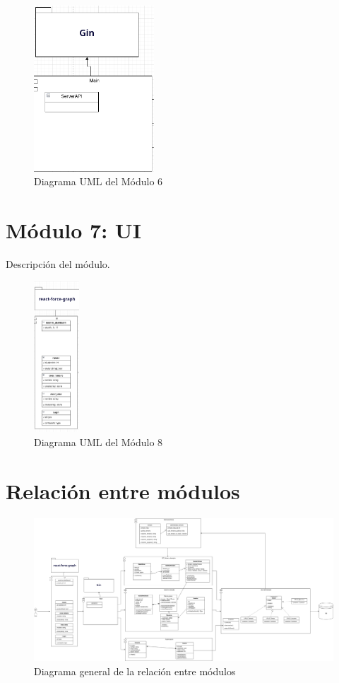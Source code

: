 \documentclass{report}
\begin{document}
\begin{figure}[H]
    \centering
    \includegraphics[width=0.4\textwidth]{./Diagramas/Modulo7.png}
    \caption{Diagrama UML del Módulo 6}
\end{figure}

\section{Módulo 7: UI}
Descripción del módulo.

\begin{figure}[H]
    \centering
    \includegraphics[width=0.15\textwidth]{./Diagramas/Modulo8.png}
    \caption{Diagrama UML del Módulo 8}
\end{figure}
\section{Relación entre módulos}

\begin{figure}[H]
    \centering
    \includegraphics[width=1.55\textwidth, angle=270]{./Diagramas/Diagrama-Modulos.png}
    \caption{Diagrama general de la relación entre módulos}
\end{figure}
\end{document}
